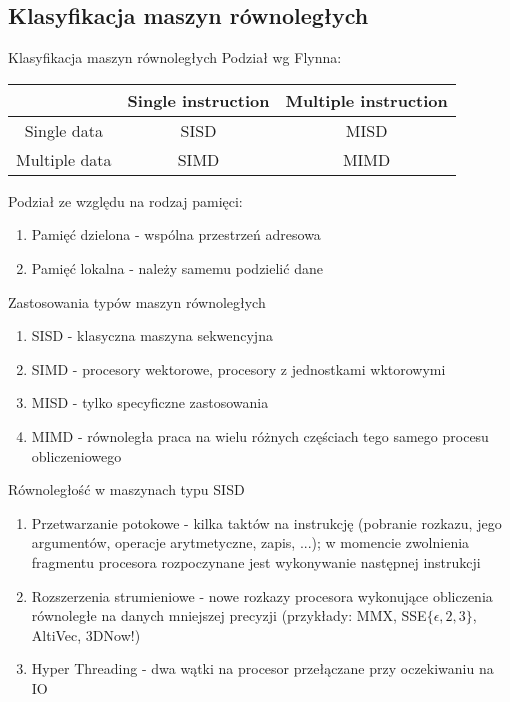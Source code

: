 \documentclass{beamer}
\begin{document}
\subsection{Klasyfikacja maszyn równoległych}

\begin{frame}{Klasyfikacja maszyn równoległych}
  Podział wg Flynna:
  \begin{tabular}{ | c | c | c | }
    \hline
    & Single instruction & Multiple instruction \\
    \hline
    Single data   & SISD               & MISD                 \\
    \hline
    Multiple data & SIMD               & MIMD                 \\
    \hline
  \end{tabular}

  \vspace{2cm}

  Podział ze względu na rodzaj pamięci:
  \begin{enumerate}
  \item Pamięć dzielona - wspólna przestrzeń adresowa
  \item Pamięć lokalna - należy samemu podzielić dane
  \end{enumerate}
\end{frame}

\begin{frame}{Zastosowania typów maszyn równoległych}
  \begin{enumerate}
  \item SISD - klasyczna maszyna sekwencyjna
  \item SIMD - procesory wektorowe, procesory z jednostkami wktorowymi
  \item MISD - tylko specyficzne zastosowania
  \item MIMD - równoległa praca na wielu różnych częściach tego samego procesu obliczeniowego
  \end{enumerate}
\end{frame}

\begin{frame}{Równoległość w maszynach typu SISD}
  \begin{enumerate}
  \item Przetwarzanie potokowe - kilka taktów na instrukcję (pobranie rozkazu, jego argumentów, operacje arytmetyczne, zapis, ...); w momencie zwolnienia fragmentu procesora rozpoczynane jest wykonywanie następnej instrukcji
  \item Rozszerzenia strumieniowe - nowe rozkazy procesora wykonujące obliczenia równoległe na danych mniejszej precyzji (przykłady: MMX, SSE$\{\epsilon,2,3\}$, AltiVec, 3DNow!)
  \item Hyper Threading - dwa wątki na procesor przełączane przy oczekiwaniu na IO
  \end{enumerate}
\end{frame}
\end{document}
